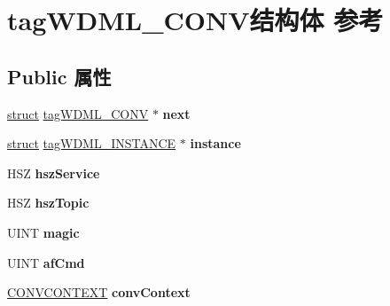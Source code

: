 \hypertarget{structtag_w_d_m_l___c_o_n_v}{}\section{tag\+W\+D\+M\+L\+\_\+\+C\+O\+N\+V结构体 参考}
\label{structtag_w_d_m_l___c_o_n_v}
\subsection*{Public 属性}
\begin{DoxyCompactItemize}
\item 
\mbox{\label{structtag_w_d_m_l___c_o_n_v_a218e055c91cdabed2c184e34878058be}} 
\hyperlink{interfacestruct}{struct} \hyperlink{structtag_w_d_m_l___c_o_n_v}{tag\+W\+D\+M\+L\+\_\+\+C\+O\+NV} $\ast$ {\bfseries next}
\item 
\mbox{\label{structtag_w_d_m_l___c_o_n_v_ae8f77056ddfb98ede7afd621931181aa}} 
\hyperlink{interfacestruct}{struct} \hyperlink{structtag_w_d_m_l___i_n_s_t_a_n_c_e}{tag\+W\+D\+M\+L\+\_\+\+I\+N\+S\+T\+A\+N\+CE} $\ast$ {\bfseries instance}
\item 
\mbox{\label{structtag_w_d_m_l___c_o_n_v_a8ca959a1288f9f6253862eb15ec82801}} 
H\+SZ {\bfseries hsz\+Service}
\item 
\mbox{\label{structtag_w_d_m_l___c_o_n_v_acacde300bebff4ac0f0278feea742b46}} 
H\+SZ {\bfseries hsz\+Topic}
\item 
\mbox{\label{structtag_w_d_m_l___c_o_n_v_a7a9c6bb1c78dfb163f70e1ff9bdd0a4d}} 
U\+I\+NT {\bfseries magic}
\item 
\mbox{\label{structtag_w_d_m_l___c_o_n_v_a1bc442cdf96ae4b2ad86157d663167ff}} 
U\+I\+NT {\bfseries af\+Cmd}
\item 
\mbox{\label{structtag_w_d_m_l___c_o_n_v_a573f4a35a45e5c3be7546f6c2898a30d}} 
\hyperlink{structtag_c_o_n_v_c_o_n_t_e_x_t}{C\+O\+N\+V\+C\+O\+N\+T\+E\+XT} {\bfseries conv\+Context}
\item 
\mbox{\label{structtag_w_d_m_l___c_o_n_v_ac9a6fec7acb27f58d7f2fb1f9bacdb70}} 

\end{DoxyCompactItemize}
